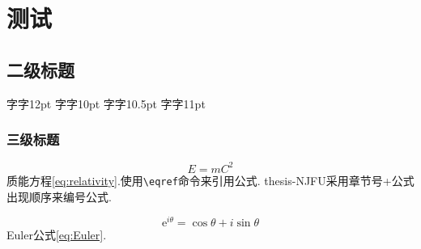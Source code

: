 \documentclass[12pt]{thesis-NJFU}
\begin{document}
\section{测试}
\subsection{二级标题}
{\normalsize 字}{\fontsize{12pt}{0pt}\selectfont 字12pt}
{\normalsize 字}{\fontsize{10pt}{0pt}\selectfont 字10pt}
{\normalsize 字}{\fontsize{10.5pt}{0pt}\selectfont 字10.5pt}
{\normalsize 字}{\fontsize{11pt}{0pt}\selectfont 字11pt}

\subsubsection{三级标题}
\begin{equation}
	E = mC^2
\label{eq:relativity}
\end{equation}
质能方程\eqref{eq:relativity}.使用\verb|\eqref|命令来引用公式.
thesis-NJFU采用章节号+公式出现顺序来编号公式.

\begin{equation}
	\mathrm{e}^{i\theta} = \cos \theta + i \sin \theta
\label{eq:Euler}
\end{equation}
Euler公式\eqref{eq:Euler}.
\end{document}

